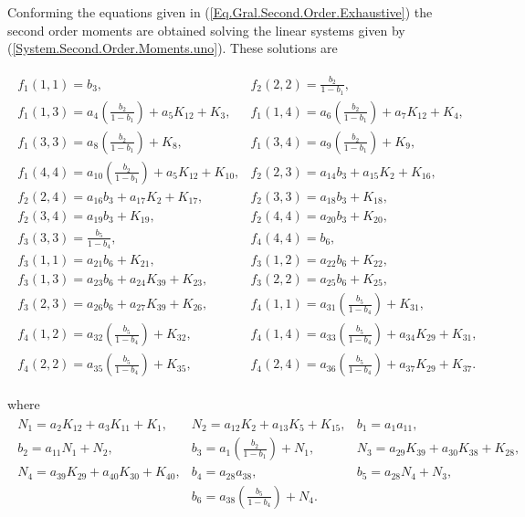 \begin{Coro}\label{Coro.Second.Order.Eqs}
Conforming the equations given in (\ref{Eq.Gral.Second.Order.Exhaustive}) the second order moments are obtained solving the linear systems given by  (\ref{System.Second.Order.Moments.uno}). These solutions are 

\begin{eqnarray}\label{Sol.System.Second.Order.Exhaustive}
\begin{array}{ll}
f_{1}\left(1,1\right)=b_{3},&
f_{2}\left(2,2\right)=\frac{b_{2}}{1-b_{1}},\\
f_{1}\left(1,3\right)=a_{4}\left(\frac{b_{2}}{1-b_{1}}\right)+a_{5}K_{12}+K_{3},&
f_{1}\left(1,4\right)=a_{6}\left(\frac{b_{2}}{1-b_{1}}\right)+a_{7}K_{12}+K_{4},\\
f_{1}\left(3,3\right)=a_{8}\left(\frac{b_{2}}{1-b_{1}}\right)+K_{8},&
f_{1}\left(3,4\right)=a_{9}\left(\frac{b_{2}}{1-b_{1}}\right)+K_{9},\\
f_{1}\left(4,4\right)=a_{10}\left(\frac{b_{2}}{1-b_{1}}\right)+a_{5}K_{12}+K_{10},&
f_{2}\left(2,3\right)=a_{14}b_{3}+a_{15}K_{2}+K_{16},\\
f_{2}\left(2,4\right)=a_{16}b_{3}+a_{17}K_{2}+K_{17},&
f_{2}\left(3,3\right)=a_{18}b_{3}+K_{18},\\
f_{2}\left(3,4\right)=a_{19}b_{3}+K_{19},&
f_{2}\left(4,4\right)=a_{20}b_{3}+K_{20},\\
f_{3}\left(3,3\right)=\frac{b_{5}}{1-b_{4}},&
f_{4}\left(4,4\right)=b_{6},\\
f_{3}\left(1,1\right)=a_{21}b_{6}+K_{21},&
f_{3}\left(1,2\right)=a_{22}b_{6}+K_{22},\\
f_{3}\left(1,3\right)=a_{23}b_{6}+a_{24}K_{39}+K_{23},&
f_{3}\left(2,2\right)=a_{25}b_{6}+K_{25},\\
f_{3}\left(2,3\right)=a_{26}b_{6}+a_{27}K_{39}+K_{26},&
f_{4}\left(1,1\right)=a_{31}\left(\frac{b_{5}}{1-b_{4}}\right)+K_{31},\\
f_{4}\left(1,2\right)=a_{32}\left(\frac{b_{5}}{1-b_{4}}\right)+K_{32},&
f_{4}\left(1,4\right)=a_{33}\left(\frac{b_{5}}{1-b_{4}}\right)+a_{34}K_{29}+K_{31},\\
f_{4}\left(2,2\right)=a_{35}\left(\frac{b_{5}}{1-b_{4}}\right)+K_{35},&
f_{4}\left(2,4\right)=a_{36}\left(\frac{b_{5}}{1-b_{4}}\right)+a_{37}K_{29}+K_{37}.
\end{array}
\end{eqnarray}

where
\begin{eqnarray*}
\begin{array}{lll}
N_{1}=a_{2}K_{12}+a_{3}K_{11}+K_{1},&
N_{2}=a_{12}K_{2}+a_{13}K_{5}+K_{15},&
b_{1}=a_{1}a_{11},\\
b_{2}=a_{11}N_{1}+N_{2},&
b_{3}=a_{1}\left(\frac{b_{2}}{1-b_{1}}\right)+N_{1},&
N_{3}=a_{29}K_{39}+a_{30}K_{38}+K_{28},\\
N_{4}=a_{39}K_{29}+a_{40}K_{30}+K_{40},&
b_{4}=a_{28}a_{38},&
b_{5}=a_{28}N_{4}+N_{3},\\
&b_{6}=a_{38}\left(\frac{b_{5}}{1-b_{4}}\right)+N_{4}.&
\end{array}
\end{eqnarray*}

\end{Coro}
